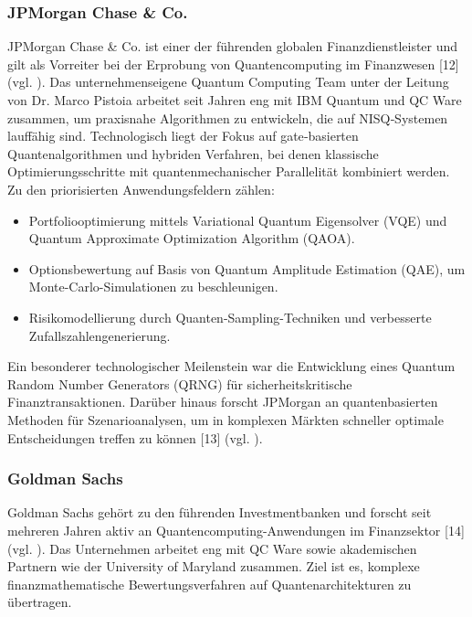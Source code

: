 \subsubsection*{JPMorgan Chase \& Co.}
JPMorgan Chase \& Co. ist einer der führenden globalen Finanzdienstleister und gilt als Vorreiter bei der Erprobung von Quantencomputing im Finanzwesen [12] (vgl. \cite{brandhofer_benchmarking_2022}).
Das unternehmenseigene Quantum Computing Team unter der Leitung von Dr. Marco Pistoia arbeitet seit Jahren eng mit IBM Quantum und QC Ware zusammen, um praxisnahe Algorithmen zu entwickeln, die auf NISQ‑Systemen lauffähig sind.
Technologisch liegt der Fokus auf gate‑basierten Quantenalgorithmen und hybriden Verfahren, bei denen klassische Optimierungsschritte mit quantenmechanischer Parallelität kombiniert werden. Zu den priorisierten Anwendungsfeldern zählen:
\begin{itemize}
\item Portfoliooptimierung mittels Variational Quantum Eigensolver (VQE) und Quantum Approximate Optimization Algorithm (QAOA).
\item Optionsbewertung auf Basis von Quantum Amplitude Estimation (QAE), um Monte-Carlo-Simulationen zu beschleunigen.
\item Risikomodellierung durch Quanten-Sampling-Techniken und verbesserte Zufallszahlengenerierung.
\end{itemize}
Ein besonderer technologischer Meilenstein war die Entwicklung eines Quantum Random Number Generators (QRNG) für sicherheitskritische Finanztransaktionen. Darüber hinaus forscht JPMorgan an quantenbasierten Methoden für Szenarioanalysen, um in komplexen Märkten schneller optimale Entscheidungen treffen zu können [13] (vgl. \cite{brandhofer_benchmarking_2022}).

\subsubsection*{Goldman Sachs}
Goldman Sachs gehört zu den führenden Investmentbanken und forscht seit mehreren Jahren aktiv an Quantencomputing-Anwendungen im Finanzsektor [14] (vgl. \cite{brandhofer_benchmarking_2022}).
Das Unternehmen arbeitet eng mit QC Ware sowie akademischen Partnern wie der University of Maryland zusammen. Ziel ist es, komplexe finanzmathematische Bewertungsverfahren auf Quantenarchitekturen zu übertragen.

